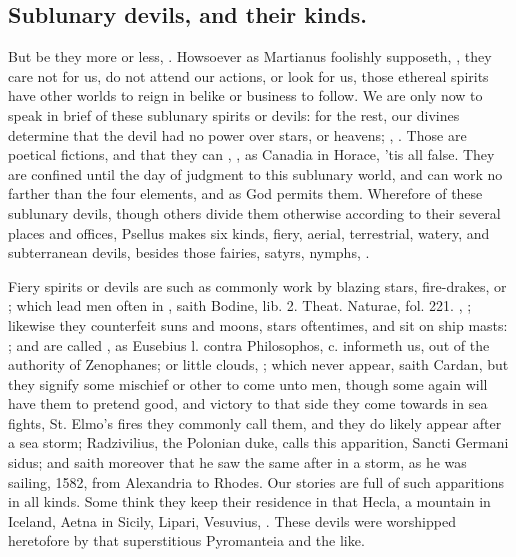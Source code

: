 {{\subsection{Sublunary devils, and their kinds.}
But be they more or less, . Howsoever as Martianus foolishly supposeth, , they care not for us, do not attend
our actions, or look for us, those ethereal spirits have other worlds
to reign in belike or business to follow. We are only now to speak in
brief of these sublunary spirits or devils: for the rest, our divines
determine that the devil had no power over stars, or heavens;
, \etc{}. Those are poetical
fictions, and that they can , \etc{}, as Canadia in Horace, 'tis all false. They are confined
until the day of judgment to this sublunary world, and can work no
farther than the four elements, and as God permits them. Wherefore of
these sublunary devils, though others divide them otherwise according
to their several places and offices, Psellus makes six kinds, fiery,
aerial, terrestrial, watery, and subterranean devils, besides those
fairies, satyrs, nymphs, \etc{}.

Fiery spirits or devils are such as commonly work by blazing stars,
fire-drakes, or ; which lead men often in , saith Bodine, lib. 2. Theat. Naturae, fol. 221. , \etc{}; likewise they
counterfeit suns and moons, stars oftentimes, and sit on ship masts: ; and are called , as Eusebius
l. contra Philosophos, c.  informeth us, out of the authority of
Zenophanes; or little clouds, ; which
never appear, saith Cardan, but they signify some mischief or other to
come unto men, though some again will have them to pretend good, and
victory to that side they come towards in sea fights, St. Elmo's fires
they commonly call them, and they do likely appear after a sea storm;
Radzivilius, the Polonian duke, calls this apparition, Sancti Germani
sidus; and saith moreover that he saw the same after in a storm, as he
was sailing, 1582, from Alexandria to Rhodes. Our stories are
full of such apparitions in all kinds. Some think they keep their
residence in that Hecla, a mountain in Iceland, Aetna in Sicily,
Lipari, Vesuvius, \etc{}. These devils were worshipped heretofore by that
superstitious Pyromanteia and the like.

}}
